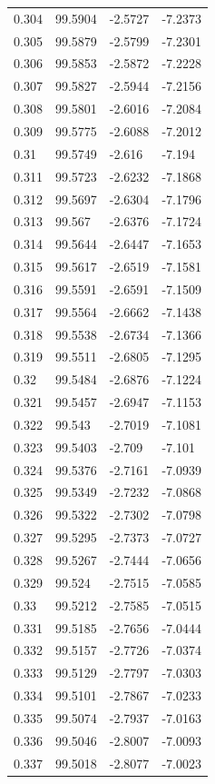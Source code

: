 \begin{tabular}{llll}
0.304 & 99.5904 & -2.5727 & -7.2373 \\
0.305 & 99.5879 & -2.5799 & -7.2301 \\
0.306 & 99.5853 & -2.5872 & -7.2228 \\
0.307 & 99.5827 & -2.5944 & -7.2156 \\
0.308 & 99.5801 & -2.6016 & -7.2084 \\
0.309 & 99.5775 & -2.6088 & -7.2012 \\
0.31 & 99.5749 & -2.616 & -7.194 \\
0.311 & 99.5723 & -2.6232 & -7.1868 \\
0.312 & 99.5697 & -2.6304 & -7.1796 \\
0.313 & 99.567 & -2.6376 & -7.1724 \\
0.314 & 99.5644 & -2.6447 & -7.1653 \\
0.315 & 99.5617 & -2.6519 & -7.1581 \\
0.316 & 99.5591 & -2.6591 & -7.1509 \\
0.317 & 99.5564 & -2.6662 & -7.1438 \\
0.318 & 99.5538 & -2.6734 & -7.1366 \\
0.319 & 99.5511 & -2.6805 & -7.1295 \\
0.32 & 99.5484 & -2.6876 & -7.1224 \\
0.321 & 99.5457 & -2.6947 & -7.1153 \\
0.322 & 99.543 & -2.7019 & -7.1081 \\
0.323 & 99.5403 & -2.709 & -7.101 \\
0.324 & 99.5376 & -2.7161 & -7.0939 \\
0.325 & 99.5349 & -2.7232 & -7.0868 \\
0.326 & 99.5322 & -2.7302 & -7.0798 \\
0.327 & 99.5295 & -2.7373 & -7.0727 \\
0.328 & 99.5267 & -2.7444 & -7.0656 \\
0.329 & 99.524 & -2.7515 & -7.0585 \\
0.33 & 99.5212 & -2.7585 & -7.0515 \\
0.331 & 99.5185 & -2.7656 & -7.0444 \\
0.332 & 99.5157 & -2.7726 & -7.0374 \\
0.333 & 99.5129 & -2.7797 & -7.0303 \\
0.334 & 99.5101 & -2.7867 & -7.0233 \\
0.335 & 99.5074 & -2.7937 & -7.0163 \\
0.336 & 99.5046 & -2.8007 & -7.0093 \\
0.337 & 99.5018 & -2.8077 & -7.0023 \\

\end{tabular}
